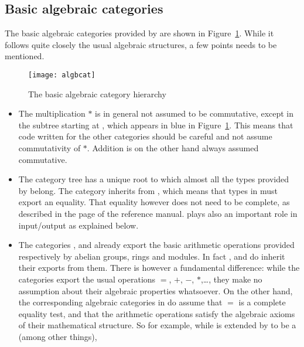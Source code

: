 \subsection{Basic algebraic categories}
The basic algebraic categories provided by \libalgebra{} are shown in
Figure~\ref{fig:cats}.
While it follows quite closely the usual algebraic structures, a few
points needs to be mentioned.
\begin{figure}[htb!]
\begin{center}
\texttt{[image: algbcat]}
\end{center}
\caption{The \libalgebra{} basic algebraic category hierarchy}
\label{fig:cats}
\end{figure}
\begin{itemize}
\item
The multiplication $\ast$ is in general not assumed to be commutative,
except in the subtree starting at , which appears
in blue in Figure~\ref{fig:cats}.
This means that code written for the other categories
should be careful and not assume commutativity of $\ast$. Addition is on
the other hand always assumed commutative.
\item
The \libalgebra{} category tree has a unique root
 to which
almost all the types provided by \libalgebra{} belong. The category
 inherits  from \libaldor,
which means that types in \libalgebra{} must export an equality.
That equality however does not need to be complete, as described
in the  page of the \libaldor{} reference manual.
 plays also an important role in input/output as
explained below.
\item
The \libaldor{} categories ,
 and 
already export the basic arithmetic operations provided respectively
by abelian groups, rings and modules. In fact
,  and 
do inherit their exports from them. There is however
a fundamental difference: while the \libaldor{} categories
export the usual operations $=$, $+$, $-$, $\ast$,\dots,
they make no assumption about their algebraic properties whatsoever.
On the other hand, the corresponding algebraic categories
in \libalgebra{} do assume that $=$ is a complete equality test, and that
the arithmetic operations satisfy the algebraic axioms of their
mathematical structure. So for example, while  is
extended by \libalgebra{} to be a  (among other things),

\end{itemize}
